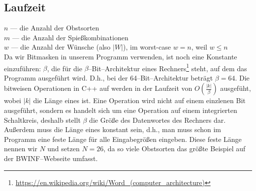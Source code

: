 \subsection{Laufzeit}\label{sec:laufzeit}
$n$ --- die Anzahl der Obstsorten\\
$m$ --- die Anzahl der Spießkombinationen\\
$w$ --- die Anzahl der Wünsche (also $|W|$), im worst-case $w = n$, weil $w \leqslant n$\\

Da wir Bitmasken in unserem Programm verwenden, ist noch eine Konstante einzuführen: $\beta$,
die für die $\beta$--Bit--Architektur eines Rechners\footnote{\href{https://en.wikipedia.org/wiki/Word_(computer_architecture)}{https://en.wikipedia.org/wiki/Word\_(computer\_architecture)}}
steht, auf dem das Programm ausgeführt wird. D.h., bei der 64--Bit--Architektur beträgt $\beta = 64$.
Die bitweisen Operationen in C++ auf  werden in der Laufzeit von $O(\frac{|k|}{\beta})$
ausgefüht, wobei $|k|$ die Länge eines  ist. Eine Operation wird nicht auf einem einzlenen Bit ausgeführt, sondern es handelt sich um eine Operation auf einem integrierten Schaltkreis, deshalb
stellt $\beta$ die Größe des Datenwortes des Rechners dar.
Außerdem muss die Länge eines 
konstant sein, d.h., man muss schon im Programm eine feste Länge für alle Eingabegrößen eingeben.
Diese feste Länge nennen wir $N$ und setzen $N =26$, da so viele Obstsorten das größte Beispiel
auf der BWINF--Webseite umfasst.

